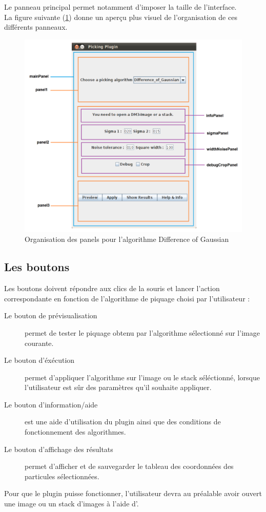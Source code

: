 Le panneau principal permet notamment d'imposer la taille de l'interface.\\
La figure suivante (\ref{panneaux}) donne un aperçu plus visuel de l'organisation de ces différents panneaux.
\begin{figure}[!h] 
\includegraphics[width=1\textwidth]{plugin3-1.png}
\caption{Organisation des panels pour l'algorithme Difference of Gaussian}
\label{panneaux}
\end{figure}
\pagebreak
\subsection{Les boutons}

Les boutons doivent répondre aux clics de la souris et lancer l'action correspondante en fonction de l'algorithme de piquage choisi par l'utilisateur :

\begin{description}
\item [Le bouton de prévisualisation] permet de tester le piquage obtenu par l'algorithme sélectionné sur l'image courante.
\item [Le bouton d'éxécution] permet d'appliquer l'algorithme sur l'image ou le stack séléctionné, lorsque l'utilisateur est s\^ur des paramètres qu'il souhaite appliquer.
\item [Le bouton d'information/aide] est une aide d'utilisation du plugin ainsi que des conditions de fonctionnement des algorithmes.
\item [Le bouton d'affichage des résultats] permet d'afficher et de sauvegarder le tableau des coordonnées des particules sélectionnées.%
\end{description}
Pour que le plugin puisse fonctionner, l'utilisateur devra au préalable avoir ouvert une image ou un stack d'images à l'aide d'\imj.

